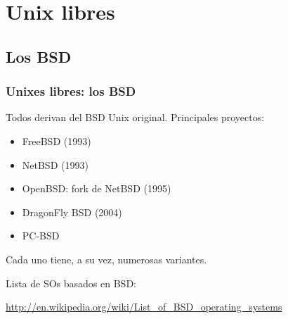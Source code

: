 \documentclass{beamer}
\begin{document}








\section{Unix libres}
\subsection{Los BSD}
\begin{frame}
\frametitle{Unixes libres: los BSD}

Todos derivan del BSD Unix original. Principales proyectos:

\begin{itemize}
\item FreeBSD (1993)
\item NetBSD (1993)
\item OpenBSD: fork de NetBSD (1995)
\item DragonFly BSD (2004)
\item PC-BSD

\end{itemize}

Cada uno tiene, a su vez, numerosas variantes.

\pause

\begin{center}
Lista de SOs basados en BSD: 
\begin{small}
\url{http://en.wikipedia.org/wiki/List_of_BSD_operating_systems}
\end{small}
\end{center}

\end{frame}
\end{document}
